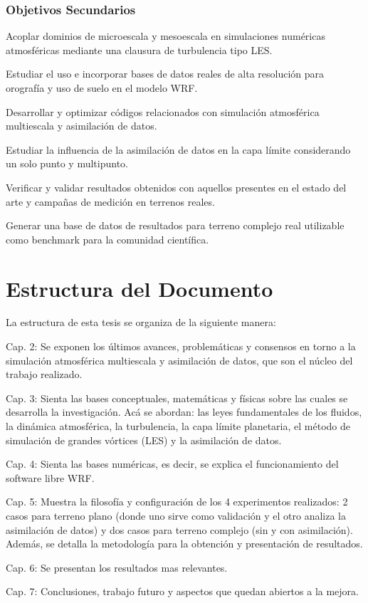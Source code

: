 \subsubsection{Objetivos Secundarios}
\begin{itemize*}
	\item Acoplar dominios de microescala y mesoescala en simulaciones numéricas atmosféricas mediante una clausura de turbulencia tipo LES.
	\item Estudiar el uso e incorporar bases de datos reales de alta resolución para orografía y uso de suelo en el modelo WRF.
	\item Desarrollar y optimizar códigos relacionados con simulación atmosférica multiescala y asimilación de datos.
	\item Estudiar la influencia de la asimilación de datos en la capa límite considerando un solo punto y multipunto.
	\item Verificar y validar resultados obtenidos con aquellos presentes en el estado del arte y campañas de medición en terrenos reales.
	\item Generar una base de datos de resultados para terreno complejo real utilizable como benchmark para la comunidad científica. 
\end{itemize*}

\section{Estructura del Documento}
La estructura de esta tesis se organiza de la siguiente manera:
\begin{itemize*}
	\item Cap. 2: Se exponen los últimos avances, problemáticas y consensos en torno a la simulación atmosférica multiescala y asimilación de datos, que son el núcleo del trabajo realizado.
	\item Cap. 3: Sienta las bases conceptuales, matemáticas y físicas sobre las cuales se desarrolla la investigación. Acá se abordan: las leyes fundamentales de los fluidos, la dinámica atmosférica, la turbulencia, la capa límite planetaria, el método de simulación de grandes vórtices (LES) y la asimilación de datos.
	\item Cap. 4: Sienta las bases numéricas, es decir, se explica el funcionamiento del software  libre WRF.
	\item Cap. 5: Muestra la filosofía y configuración de los 4 experimentos realizados: 2 casos para terreno plano (donde uno sirve como validación y el otro analiza la asimilación de datos) y dos casos para terreno complejo (sin y con asimilación). Además, se detalla la metodología para la obtención y presentación de resultados.
	\item Cap. 6: Se presentan los resultados mas relevantes.
	\item Cap. 7: Conclusiones, trabajo futuro y aspectos que quedan abiertos a la mejora.
\end{itemize*}
